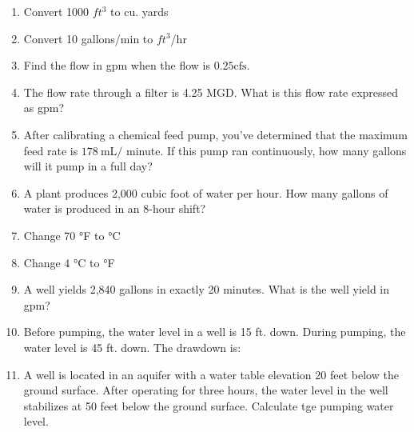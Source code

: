 \begin{enumerate}[1.]
\item Convert 1000 $ft^3$ to cu. yards\\

\item Convert 10 gallons/min to $ft^3$/hr\\




\item Find the flow in gpm when the flow is $0.25 \mathrm{cfs}$.

\item The flow rate through a filter is 4.25 MGD. What is this flow rate expressed as gpm?\\

\item After calibrating a chemical feed pump, you've determined that the maximum feed rate is $178 \mathrm{~mL} /$ minute. If this pump ran continuously, how many gallons will it pump in a full day?

\item A plant produces 2,000 cubic foot of water per hour. How many gallons of water is produced in an 8-hour shift?

\item Change 70 °F to °C
\item Change 4 °C to °F

\item A well yields 2,840 gallons in exactly 20 minutes. What is the well yield in gpm?\\

\item Before pumping, the water level in a well is 15 ft. down. During pumping, the water level is 45 ft. down. The drawdown is:\\

\item A well is located in an aquifer with a water table elevation 20 feet below the ground surface. After operating for three hours, the water level in the well stabilizes at 50 feet below the ground surface. Calculate tge pumping water level.\\


\end{enumerate}
